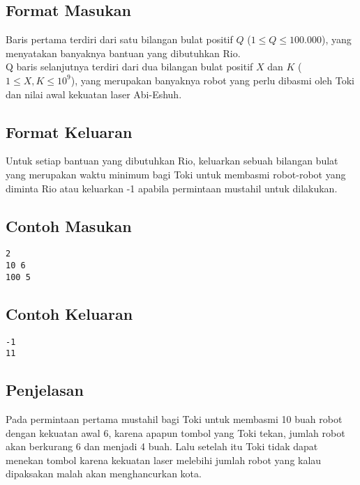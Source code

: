 \documentclass{article}
\begin{document}
\subsection*{Format Masukan}

Baris pertama terdiri dari satu bilangan bulat positif $Q$ ($1 \leq Q \leq 100.000$), yang menyatakan banyaknya bantuan yang dibutuhkan Rio.\\
Q baris selanjutnya terdiri dari dua bilangan bulat positif $X$ dan $K$ ($1 \leq X, K \leq 10^9$), yang merupakan banyaknya robot yang perlu dibasmi oleh Toki dan nilai awal kekuatan laser Abi-Eshuh.

\subsection*{Format Keluaran}

Untuk setiap bantuan yang dibutuhkan Rio, keluarkan sebuah bilangan bulat yang merupakan waktu minimum bagi Toki untuk membasmi robot-robot yang diminta Rio atau keluarkan -1 apabila permintaan mustahil untuk dilakukan.

\begin{multicols}{2}
\subsection*{Contoh Masukan}
\begin{lstlisting}
2
10 6
100 5
\end{lstlisting}
\columnbreak
\subsection*{Contoh Keluaran}
\begin{lstlisting}
-1
11
\end{lstlisting}
\vfill
\null
\end{multicols}

\subsection*{Penjelasan}
Pada permintaan pertama mustahil bagi Toki untuk membasmi 10 buah robot dengan kekuatan awal 6, karena apapun tombol yang Toki tekan, jumlah robot akan berkurang 6 dan menjadi 4 buah. Lalu setelah itu Toki tidak dapat menekan tombol karena kekuatan laser melebihi jumlah robot yang kalau dipaksakan malah akan menghancurkan kota.
\end{document}
